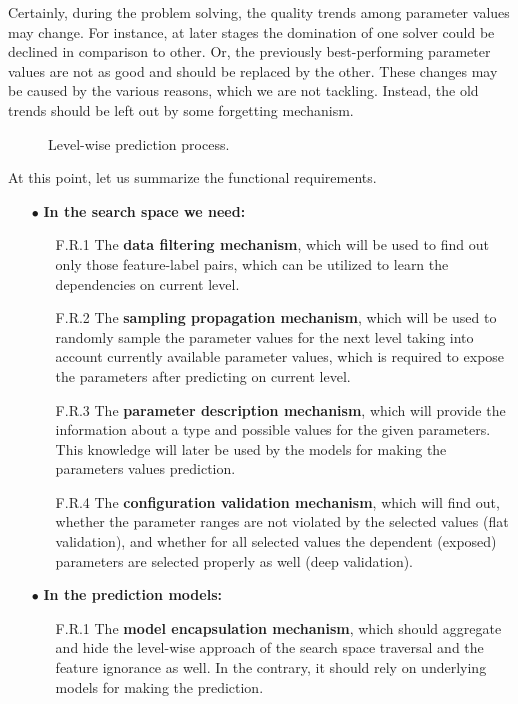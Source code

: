 Certainly, during the problem solving, the quality trends among parameter values may change. For instance, at later stages the domination of one solver could be declined in comparison to other. Or, the previously best-performing parameter values are not as good and should be replaced by the other. These changes may be caused by the various reasons, which we are not tackling. Instead, the old trends should be left out by some forgetting mechanism.

\begin{figure}
	\centering
	
	\caption{Level-wise prediction process.}
	\label{concept:pict:Level-wise prediction process}
\end{figure}

At this point, let us summarize the functional requirements.
\begin{itemize}
	\item[$\bullet$] \textbf{In the search space we need:}
	\begin{enumerate}
		\item[F.R.1] The \textbf{data filtering mechanism}, which will be used to find out only those feature-label pairs, which can be utilized to learn the dependencies on current level.
		
		\item[F.R.2] The \textbf{sampling propagation mechanism}, which will be used to randomly sample the parameter values for  the next level taking into account currently available parameter values, which is required to expose the parameters after predicting on current level.
		
		\item[F.R.3] The \textbf{parameter description mechanism}, which will provide the information about a type and possible values for the given parameters. This knowledge will later be used by the models for making the parameters values prediction.
		
		\item[F.R.4] The \textbf{configuration validation mechanism}, which will find out, whether the parameter ranges are not violated by the selected values (flat validation), and whether for all selected values the dependent (exposed) parameters are selected properly as well (deep validation).
	\end{enumerate}

	\item[$\bullet$] \textbf{In the prediction models:}
	\begin{enumerate}
		\item[F.R.1] The \textbf{model encapsulation mechanism}, which should aggregate and hide the level-wise approach of the search space traversal and the feature ignorance as well. In the contrary, it should rely on underlying models for making the prediction.
		

\end{enumerate}
\end{itemize}
